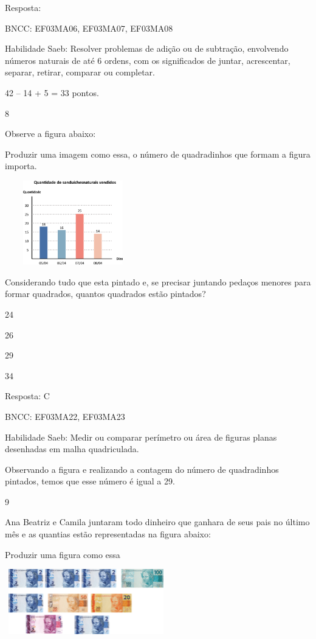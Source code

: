 \begin{escolha}
Resposta:

BNCC: EF03MA06, EF03MA07, EF03MA08

Habilidade Saeb: Resolver problemas de adição ou de subtração,
envolvendo números naturais de até 6 ordens, com os significados de
juntar, acrescentar, separar, retirar, comparar ou completar.

42 -- 14 + 5 = 33 pontos.

\num{8}

Observe a figura abaixo:

Produzir uma imagem como essa, o número de quadradinhos que formam a
figura importa.

\includegraphics[width=2.32692in,height=1.43990in]{media/image109.png}

Considerando tudo que esta pintado e, se precisar juntando pedaços
menores para formar quadrados, quantos quadrados estão pintados?

\begin{escolha}
\item
  24
\item
  26
\item
  29
\item
  34
\end{escolha}

Resposta: C

BNCC: EF03MA22, EF03MA23

Habilidade Saeb: Medir ou comparar perímetro ou área de figuras planas
desenhadas em malha quadriculada.

Observando a figura e realizando a contagem do número de quadradinhos
pintados, temos que esse número é igual a 29.

\num{9}

Ana Beatriz e Camila juntaram todo dinheiro que ganhara de seus pais no
último mês e as quantias estão representadas na figura abaixo:

Produzir uma figura como essa

\includegraphics[width=2.77564in,height=1.11703in]{media/image110.png}


\end{escolha}

